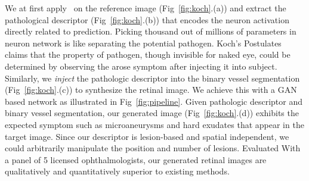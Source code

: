 \documentclass[letterpaper]{article} %
\begin{document}
    We at first apply~\cite{oO2016detector} on the  reference image (Fig~\ref{fig:koch}.(a)) and extract the pathological descriptor (Fig~\ref{fig:koch}.(b)) that encodes the neuron activation directly related to prediction. Picking thousand out of  millions of parameters in neuron network is like separating the potential pathogen. Koch's Postulates claims that the property of pathogen, though invisible for naked eye, could be determined by observing the arose symptom after injecting it into subject.  Similarly, we \emph{inject} the pathologic descriptor into the binary vessel segmentation (Fig~\ref{fig:koch}.(c)) to synthesize the retinal image. We achieve this with a GAN based network as illustrated in Fig~\ref{fig:pipeline}. Given pathologic descriptor and binary vessel segmentation, our generated image (Fig~\ref{fig:koch}.(d))  exhibits the expected symptom such as microaneurysms and hard exudates that appear in the target image. Since our descriptor is lesion-based and spatial independent, we could arbitrarily manipulate the position and number of lesions. Evaluated With a panel of 5  licensed  ophthalmologists, our generated retinal images are  qualitatively and quantitatively superior to existing methods. 
    
    
	
    
    
    
    
\end{document}
